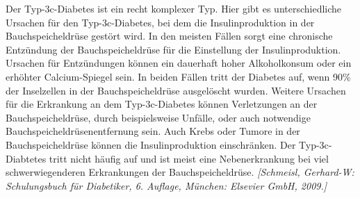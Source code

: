 \documentclass[a4paper,11pt]{article}%
\renewcommand{\\}{\vspace*{0.5\baselineskip} \newline}
\begin{document}
		Der Typ-3c-Diabetes ist ein recht komplexer Typ. Hier gibt es unterschiedliche Ursachen für den Typ-3c-Diabetes, bei dem die Insulinproduktion in der Bauchspeicheldrüse gestört wird. In den meisten Fällen sorgt eine chronische Entzündung der Bauchspeicheldrüse für die Einstellung der Insulinproduktion. Ursachen für Entzündungen können ein dauerhaft hoher Alkoholkonsum oder ein erhöhter Calcium-Spiegel sein. In beiden Fällen tritt der Diabetes auf, wenn 90\% der Inselzellen in der Bauchspeicheldrüse ausgelöscht wurden.\newline
		Weitere Ursachen für die Erkrankung an dem Typ-3c-Diabetes können Verletzungen an der Bauchspeicheldrüse, durch beispielsweise Unfälle, oder auch notwendige Bauchspeicheldrüsenentfernung sein. Auch Krebs oder Tumore in der Bauchspeicheldrüse können die Insulinproduktion einschränken. Der Typ-3c-Diabtetes tritt nicht häufig auf und ist meist eine Nebenerkrankung bei viel schwerwiegenderen Erkrankungen der Bauchspeicheldrüse. \emph{[Schmeisl, Gerhard-W: Schulungsbuch für Diabetiker, 6. Auflage, München: Elsevier GmbH, 2009.]} 
\end{document}
